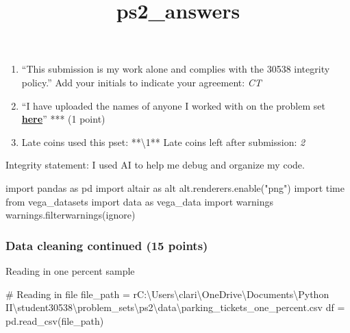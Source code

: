 \documentclass[
  letterpaper,
  DIV=11,
  numbers=noendperiod]{scrartcl}
\title{ps2\_answers}
\author{}
\date{}
\newenvironment{Shaded}{\begin{snugshade}}{\end{snugshade}}
\newcommand{\CommentTok}[1]{\textcolor[rgb]{0.37,0.37,0.37}{#1}}
\newcommand{\ImportTok}[1]{\textcolor[rgb]{0.00,0.46,0.62}{#1}}
\newcommand{\NormalTok}[1]{\textcolor[rgb]{0.00,0.23,0.31}{#1}}
\newcommand{\OperatorTok}[1]{\textcolor[rgb]{0.37,0.37,0.37}{#1}}
\newcommand{\StringTok}[1]{\textcolor[rgb]{0.13,0.47,0.30}{#1}}
\newcommand{\VerbatimStringTok}[1]{\textcolor[rgb]{0.13,0.47,0.30}{#1}}
\providecommand{\tightlist}{%
  \setlength{\itemsep}{0pt}\setlength{\parskip}{0pt}}\usepackage{longtable,booktabs,array}
\begin{document}
\maketitle



\begin{enumerate}
\def\labelenumi{\arabic{enumi}.}
\tightlist
\item
  ``This submission is my work alone and complies with the 30538
  integrity policy.'' Add your initials to indicate your agreement:
  \emph{CT}
\item
  ``I have uploaded the names of anyone I worked with on the problem set
  \textbf{\href{https://docs.google.com/forms/d/1-zzHx762odGlpVWtgdIC55vqF-j3gqdAp6Pno1rIGK0/edit}{here}}''
  **\C\T** (1 point)
\item
  Late coins used this pset: **\textbackslash1** Late coins left after
  submission: \emph{2}
\end{enumerate}

Integrity statement: I used AI to help me debug and organize my code.

\begin{Shaded}
\begin{Highlighting}[]
\ImportTok{import}\NormalTok{ pandas }\ImportTok{as}\NormalTok{ pd}
\ImportTok{import}\NormalTok{ altair }\ImportTok{as}\NormalTok{ alt}
\NormalTok{alt.renderers.enable(}\StringTok{"png"}\NormalTok{)}
\ImportTok{import}\NormalTok{ time}
\ImportTok{from}\NormalTok{ vega\_datasets }\ImportTok{import}\NormalTok{ data }\ImportTok{as}\NormalTok{ vega\_data}
\ImportTok{import}\NormalTok{ warnings }
\NormalTok{warnings.filterwarnings(}\StringTok{\textquotesingle{}ignore\textquotesingle{}}\NormalTok{)}
\end{Highlighting}
\end{Shaded}

\subsubsection{Data cleaning continued (15
points)}\label{data-cleaning-continued-15-points}

Reading in one percent sample

\begin{Shaded}
\begin{Highlighting}[]
\CommentTok{\# Reading in file}
\NormalTok{file\_path }\OperatorTok{=} \VerbatimStringTok{r\textquotesingle{}C:\textbackslash{}Users\textbackslash{}clari\textbackslash{}OneDrive\textbackslash{}Documents\textbackslash{}Python II\textbackslash{}student30538\textbackslash{}problem\_sets\textbackslash{}ps2\textbackslash{}data\textbackslash{}parking\_tickets\_one\_percent.csv\textquotesingle{}}
\NormalTok{df }\OperatorTok{=}\NormalTok{ pd.read\_csv(file\_path)}
\end{Highlighting}
\end{Shaded}
\end{document}
